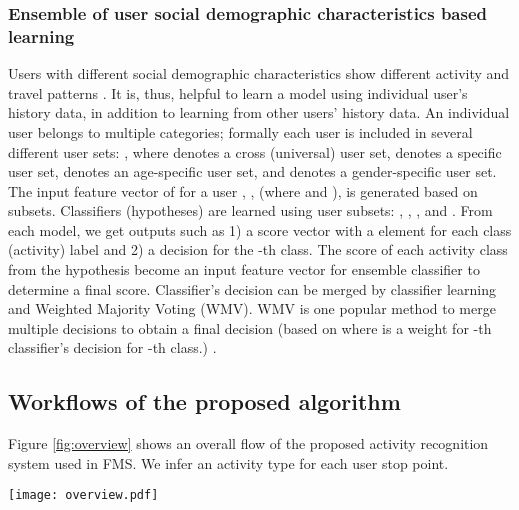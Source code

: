 \documentclass{sig-alternate}
\begin{document}
\subsubsection{Ensemble of user social demographic characteristics based learning}
Users with different social demographic characteristics show different activity and travel patterns \cite{Jiang2012Clustering,Kwan1999Gender}. It is, thus, helpful to learn a model using individual user's history data, in addition to learning from other users' history data. An individual user belongs to multiple categories; formally each user is included in several different user sets: , where  denotes a cross (universal) user set,  denotes a specific user set,  denotes an age-specific user set, and  denotes a gender-specific user set. The input feature vector of  for a user , , (where  and ), is generated based on subsets. Classifiers (hypotheses) are learned using user subsets: , , , and . From each model, we get outputs such as 1) a score vector with a element  for each class (activity) label and 2) a decision  for the -th class. The score of each activity class from the hypothesis  become an input feature vector for ensemble classifier to determine a final score. Classifier's decision can be merged by classifier learning and Weighted Majority Voting (WMV). WMV is one popular method to merge multiple decisions to obtain a final decision (based on  where   is a weight for -th classifier's decision  for -th class.) \cite{Polikar2006Ensemble}.



\subsection{Workflows of the proposed algorithm}
Figure \ref{fig:overview} shows an overall flow of the proposed activity recognition system used in FMS. We infer an activity type for each user stop point.


\begin{figure*}[tb]
        \centering
\texttt{[image: overview.pdf]}
        \caption{Overview of the proposed activity recognition system. Based on given an identified stop (detected by the current stop detection algorithm), the algorithm identifies an activity based on spatial, temporal, transition, and contextual features. We assume that his/her home location is known beforehand (provided when he/she registered in the website).    }
        \label{fig:overview}\end{figure*}
\end{document}
